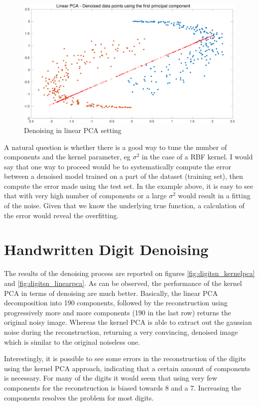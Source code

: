 \documentclass[11pt, a4paper]{article}
\begin{document}
\begin{figure}[H]
  \centering
  \includegraphics[scale=.30]{kpca_linear.pdf}
  \caption{Denoising in linear PCA setting}
  \label{fig:kpca_linear}
\end{figure}

A natural question is whether there is a good way to tune the number
of components and the kernel parameter, eg $\sigma^2$ in the case of a
RBF kernel. I would say that one way to proceed would be to
systematically compute the error between a denoised model trained on a
part of the dataset (training set), then compute the error made using
the test set. In the example above, it is easy to see that with very
high number of components or a large $\sigma^2$ would result in a
fitting of the noise. Given that we know the underlying true function,
a calculation of the error would reveal the overfitting.

\newpage
\section{Handwritten Digit Denoising}

The results of the denoising process are reported on figures
\ref{fig:digitsn_kernelpca} and \ref{fig:digitsn_linearpca}. As can be
observed, the performance of the kernel PCA in terms of denoising are
much better. Basically, the linear PCA decomposition into 190
components, followed by the reconstruction using progressively more
and more components (190 in the last row) returns the original noisy
image. Whereas the kernel PCA is able to extract out the gaussian
noise during the reconstruction, returning a very convincing, denoised
image which is similar to the original noiseless one.

Interestingly, it is possible to see some errors in the reconstruction
of the digits using the kernel PCA approach, indicating that a certain
amount of components is necessary. For many of the digits it would
seem that using very few components for the reconstruction is biased
towards 8 and a 7. Increasing the components resolves the problem for
most digits.
\end{document}
